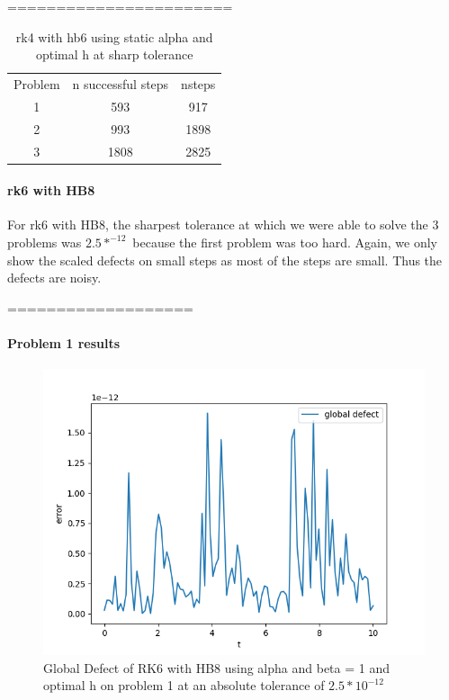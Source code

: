 \documentclass{article}
\begin{document}
=======================
\begin{table}[h]
\caption {rk4 with hb6 using static alpha and optimal h at sharp tolerance} \label{tab:rk4_with_hb6_sharp_tolerance}
\begin{center}
\begin{tabular}{ c c c } 
Problem & n successful steps      &       nsteps \\ 
1       & 593                     &        917              \\ 
2       & 993                     &        1898             \\
3       & 1808                    &        2825             \\
\end{tabular}
\end{center}
\end{table}	


\paragraph{rk6 with HB8}
For rk6 with HB8, the sharpest tolerance at which we were able to solve the 3 problems was $2.5*^{-12}$ because the first problem was too hard. Again, we only show the scaled defects on small steps as most of the steps are small. Thus the defects are noisy.

===================
\paragraph{Problem 1 results}
\begin{figure}[H]
\centering
\includegraphics[width=0.7\linewidth]{./figures/sharp_tolerance_rk6_with_hb8_p1_global_defect}
\caption{Global Defect of RK6 with HB8 using alpha and beta = 1 and optimal h on problem 1 at an absolute tolerance of $2.5*10^{-12}$}
\label{fig:sharp_tolerance_rk6_with_hb8_p1_global_defect}
\end{figure}
\end{document}
